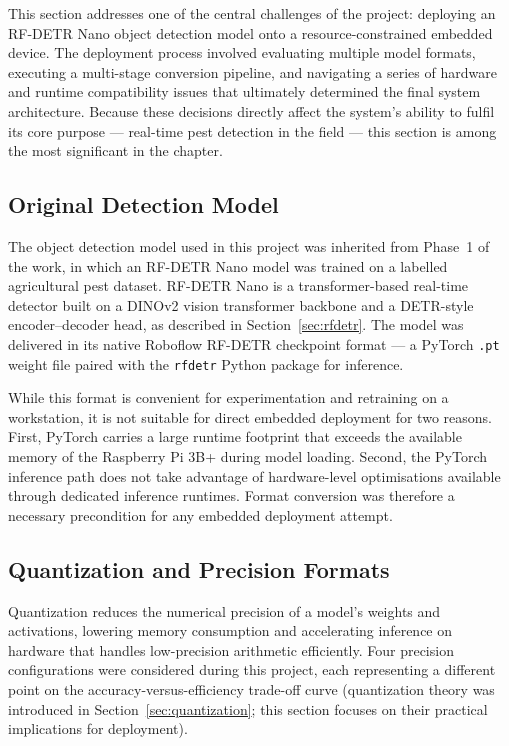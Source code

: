 This section addresses one of the central challenges of the project:
deploying an RF-DETR Nano object detection model onto a
resource-constrained embedded device. The deployment process involved
evaluating multiple model formats, executing a multi-stage conversion
pipeline, and navigating a series of hardware and runtime
compatibility issues that ultimately determined the final system
architecture. Because these decisions directly affect the system's
ability to fulfil its core purpose — real-time pest detection in the
field — this section is among the most significant in the chapter.

\subsection{Original Detection Model}
\label{sec:original_model}

The object detection model used in this project was inherited from
Phase~1 of the work, in which an RF-DETR Nano model was trained on a
labelled agricultural pest dataset. RF-DETR Nano is a transformer-based
real-time detector built on a DINOv2 vision transformer backbone and a
DETR-style encoder–decoder head, as described in
Section~\ref{sec:rfdetr}. The model was delivered in its native
Roboflow RF-DETR checkpoint format — a PyTorch \texttt{.pt} weight
file paired with the \texttt{rfdetr} Python package for inference.

While this format is convenient for experimentation and retraining on
a workstation, it is not suitable for direct embedded deployment for
two reasons. First, PyTorch carries a large runtime footprint that
exceeds the available memory of the Raspberry Pi 3B+ during model
loading. Second, the PyTorch inference path does not take advantage of
hardware-level optimisations available through dedicated inference
runtimes. Format conversion was therefore a necessary precondition for
any embedded deployment attempt.

\subsection{Quantization and Precision Formats}
\label{sec:quant_formats}

Quantization reduces the numerical precision of a model's weights and
activations, lowering memory consumption and accelerating inference on
hardware that handles low-precision arithmetic efficiently. Four
precision configurations were considered during this project, each
representing a different point on the accuracy-versus-efficiency
trade-off curve (quantization theory was introduced in
Section~\ref{sec:quantization}; this section focuses on their
practical implications for deployment).

